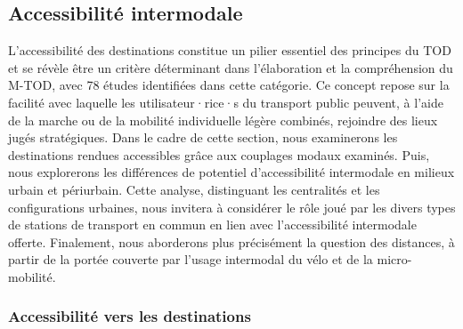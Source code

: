 \begin{refsegment}
\subsection{Accessibilité intermodale
    \label{chap2:accessibilite-intermodale}
    }
    
L'accessibilité des destinations constitue un pilier essentiel des principes du \acrshort{TOD} et se révèle être un critère déterminant dans l'élaboration et la compréhension du \acrshort{M-TOD}, avec 78 études identifiées dans cette catégorie. Ce concept repose sur la facilité avec laquelle les utilisateur·rice·s du transport public peuvent, à l'aide de la marche ou de la mobilité individuelle légère combinés, rejoindre des lieux jugés stratégiques. Dans le cadre de cette section, nous examinerons les destinations rendues accessibles grâce aux couplages modaux examinés. Puis, nous explorerons les différences de potentiel d'accessibilité intermodale en milieux urbain et \gls{périurbain}. Cette analyse, distinguant les centralités et les configurations urbaines, nous invitera à considérer le rôle joué par les divers types de stations de transport en commun en lien avec l'accessibilité intermodale offerte. Finalement, nous aborderons plus précisément la question des distances, à partir de la portée couverte par l'usage intermodal du vélo et de la micro-mobilité.%

\subsubsection*{Accessibilité vers les destinations
    \label{chap2:accessibilite-destinations}
    }
    

\end{refsegment}

